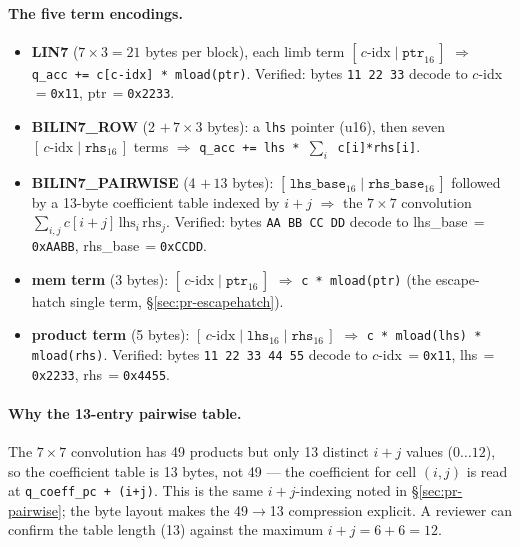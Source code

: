 \paragraph{The five term encodings.}
\begin{itemize}[leftmargin=1.4em,itemsep=2pt]
\item \textbf{LIN7} ($7\!\times\!3 = 21$ bytes per block), each
  limb term $[\,c\text{-idx} \mid \texttt{ptr}_{16}\,]$
  $\Rightarrow$ \texttt{q\_\allowbreak{}acc += c[c-idx] * mload(ptr)}.
  Verified: bytes \texttt{11 22 33} decode to
  $c$-idx\,$=$\texttt{0x11}, ptr\,$=$\texttt{0x2233}.
\item \textbf{BILIN7\_ROW} (2 $+\,7\!\times\!3$ bytes): a
  \texttt{lhs} pointer (u16), then seven
  $[\,c\text{-idx} \mid \texttt{rhs}_{16}\,]$ terms
  $\Rightarrow$ \texttt{q\_\allowbreak{}acc += lhs * $\sum_i$ c[i]*rhs[i]}.
\item \textbf{BILIN7\_PAIRWISE} (4 $+\,13$ bytes):
  $[\,\texttt{lhs\_base}_{16} \mid \texttt{rhs\_base}_{16}\,]$
  followed by a 13-byte coefficient table indexed by $i+j$
  $\Rightarrow$ the $7\!\times\!7$ convolution
  $\sum_{i,j} c[i{+}j]\,\text{lhs}_i\,\text{rhs}_j$. Verified:
  bytes \texttt{AA BB CC DD} decode to
  lhs\_base\,$=$\texttt{0xAABB}, rhs\_base\,$=$\texttt{0xCCDD}.
\item \textbf{mem term} (3 bytes): $[\,c\text{-idx} \mid \texttt{ptr}_{16}\,]$
  $\Rightarrow$ \texttt{c * mload(ptr)} (the escape-hatch single
  term, §\ref{sec:pr-escapehatch}).
\item \textbf{product term} (5 bytes):
  $[\,c\text{-idx} \mid \texttt{lhs}_{16} \mid \texttt{rhs}_{16}\,]$
  $\Rightarrow$ \texttt{c * mload(lhs) * mload(rhs)}. Verified:
  bytes \texttt{11 22 33 44 55} decode to
  $c$-idx\,$=$\texttt{0x11}, lhs\,$=$\texttt{0x2233},
  rhs\,$=$\texttt{0x4455}.
\end{itemize}

\paragraph{Why the 13-entry pairwise table.}
The $7\!\times\!7$ convolution has 49 products but only 13
distinct $i+j$ values ($0\ldots12$), so the coefficient table is
13 bytes, not 49 --- the coefficient for cell $(i,j)$ is read at
\texttt{q\_\allowbreak{}coeff\_\allowbreak{}pc + (i+j)}. This is the same
$i{+}j$-indexing noted in §\ref{sec:pr-pairwise}; the byte layout
makes the 49$\to$13 compression explicit. A reviewer can confirm
the table length (13) against the maximum $i+j = 6+6 = 12$.

